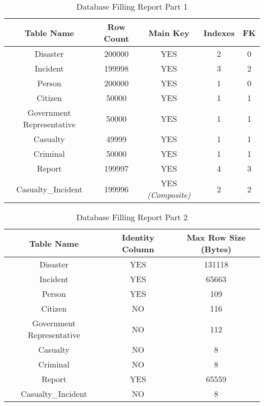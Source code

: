 \begin{table}[h!]
\centering
\begin{tabular}{||c | c | c | c | c||} 
 \hline
 Table Name & Row Count & Main Key & Indexes & FK  \\ [0.5ex] 
 \hline\hline
 Disaster & 200000 & YES & 2 & 0 \\ 
 \hline
 Incident & 199998 & YES & 3 & 2 \\
 \hline
 Person & 200000 & YES & 1 & 0 \\
 \hline
 Citizen & 50000 & YES & 1 & 1 \\
 \hline
 Government Representative & 50000 & YES & 1 & 1 \\
 \hline
 Casualty & 49999 & YES & 1 & 1 \\
 \hline
 Criminal & 50000 & YES & 1 & 1 \\
 \hline
 Report & 199997 & YES & 4 & 3 \\
 \hline
 Casualty\_Incident & 199996 & YES \emph{(Composite)} & 2 & 2 \\ [1ex] 
 \hline
\end{tabular}
\caption{Database Filling Report Part 1}
\label{table:1}
\end{table}

\begin{table}[h!]
\centering
\begin{tabular}{||c | c | c||} 
 \hline
 Table Name & Identity Column & Max Row Size (Bytes) \\ [0.5ex] 
 \hline\hline
 Disaster & YES & 131118 \\ 
 \hline
 Incident & YES & 65663 \\
 \hline
 Person & YES & 109 \\
 \hline
 Citizen & NO & 116 \\
 \hline
 Government Representative & NO & 112 \\
 \hline
 Casualty & NO & 8 \\
 \hline
 Criminal & NO & 8 \\
 \hline
 Report & YES & 65559 \\
 \hline
 Casualty\_Incident & NO & 8 \\ [1ex] 
 \hline
\end{tabular}
\caption{Database Filling Report Part 2}
\label{table:2}
\end{table}